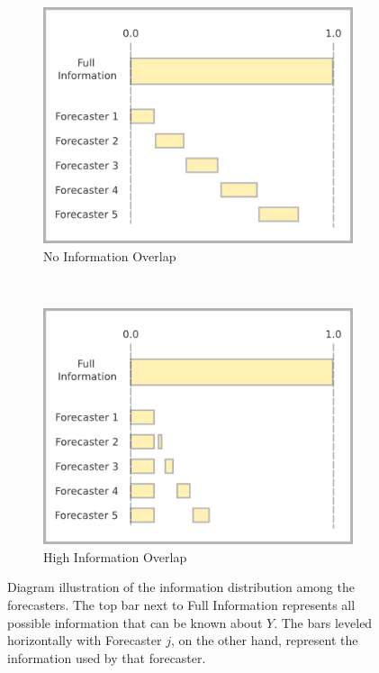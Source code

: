 \documentclass[11pt]{article}
\theoremstyle{definition}
\theoremstyle{definition}
\begin{document}
\begin{figure}[t!]
        \centering
        \begin{subfigure}[b]{0.49\textwidth}
                \includegraphics[width=\textwidth]{IndepDiagram}
                \caption{No Information Overlap}
                \label{DiagramsA}
        \end{subfigure}%
        ~ %
        \begin{subfigure}[b]{0.49\textwidth}
                \includegraphics[width=\textwidth]{DepDiagram}
                \caption{High Information Overlap}
                \label{DiagramsB}
        \end{subfigure}
   \caption{Diagram illustration of the information distribution among the forecasters. The top bar next to Full Information represents all possible information that can be known about $Y$. The bars leveled horizontally with Forecaster $j$, on the other hand, represent the information used by that forecaster.}    
        \label{Diagrams}
\end{figure}
\end{document}

